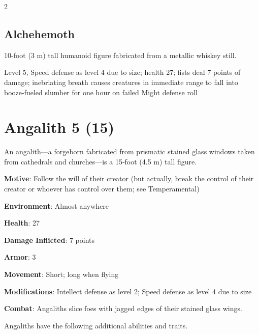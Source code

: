 \begin{multicols}{2}
\subsection{Alchehemoth}

10-foot (3 m) tall humanoid figure fabricated from a metallic whiskey still. 

Level 5, Speed defense as level 4 due to size; health 27; fists deal 7 points of damage; inebriating breath causes creatures in immediate range to fall into booze-fueled slumber for one hour on failed Might defense roll

\section{Angalith 5 (15)}

An angalith—a forgeborn fabricated from prismatic stained glass windows taken from cathedrals and churches—is a 15‑foot (4.5 m) tall figure.

\textbf{Motive}: Follow the will of their creator (but actually, break the control of their creator or whoever has control over them; see Temperamental) 

\textbf{Environment}: Almost anywhere 

\textbf{Health}: 27 

\textbf{Damage Inflicted}: 7 points 

\textbf{Armor}: 3 

\textbf{Movement}: Short; long when flying 

\textbf{Modifications}: Intellect defense as level 2; Speed defense as level 4 due to size 

\textbf{Combat}: Angaliths slice foes with jagged edges of their stained glass wings. 

Angaliths have the following additional abilities and traits.


\end{multicols}
